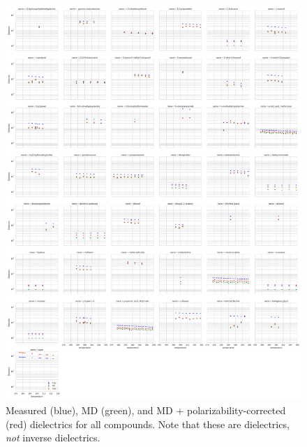 \documentclass[journal=jacsat,manuscript=article]{achemso}
\begin{document}
\begin{figure}

\includegraphics[width=\columnwidth]{./figures/dielectric_versus_temperature_all.pdf}

\caption{Measured (blue), MD (green), and MD + polarizability-corrected (red) dielectrics for all compounds.  Note that these are dielectrics, \emph{not} inverse dielectrics.
}
\label{figure:AllDielectrics}

\end{figure}
\end{document}
